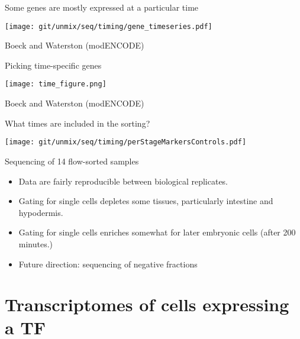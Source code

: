 \documentclass[serif,9pt]{beamer}
\begin{document}
\begin{frame}{Some genes are mostly expressed at a particular time}

\texttt{[image: git/unmix/seq/timing/gene\_timeseries.pdf]}

\hfill Boeck and Waterston (modENCODE)

\end{frame}

\begin{frame}{Picking time-specific genes}

\texttt{[image: time\_figure.png]}

\hfill Boeck and Waterston (modENCODE)

\end{frame}

\begin{frame}{What times are included in the sorting?}

\begin{centering}
\texttt{[image: git/unmix/seq/timing/perStageMarkersControls.pdf]}
\end{centering}

\end{frame}

\begin{frame}{Sequencing of 14 flow-sorted samples}

\begin{itemize}

\item Data are fairly reproducible between biological replicates.

\item Gating for single cells depletes some tissues, particularly
intestine and hypodermis.

\item Gating for single cells enriches somewhat for later embryonic
cells (after 200 minutes.)

\pause
\item Future direction: sequencing of negative fractions

\end{itemize}

\end{frame}

\section{Transcriptomes of cells expressing a TF}
\end{document}
